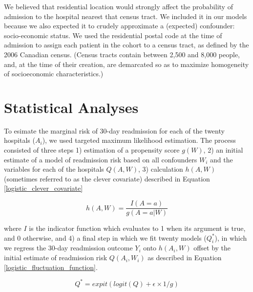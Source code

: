 \documentclass[]{article}\usepackage[]{graphicx}\usepackage[]{color}
\begin{document}
We believed that residential location would strongly affect the probability of admission to the hospital nearest that census tract. We included it in our models because we also expected it to crudely approximate a (expected) confounder: socio-economic status.  We used the residential postal code at the time of admission to assign each patient in the cohort to a census tract, as defined by the 2006 Canadian census. (Census tracts contain between 2,500 and 8,000 people, and, at the time of their creation, are demarcated so as to maximize homogeneity of socioeconomic characteristics.)

\section{Statistical Analyses}
To esimate the marginal risk of 30-day readmission for each of the twenty hospitals ($A_i$), we used targeted maximum likelihood estimation. The process consisted of three steps 1) estimation of a propensity score $g(W)$, 2) an initial estimate of a model of readmission risk based on all confounders $W_i$ and the variables for each of the hospitals $Q(A,W)$, 3) calculation $h(A,W)$ (sometimes referred to as the clever covariate) described in Equation \ref{logistic_clever_covariate}

\begin{equation}
\label{logistic_clever_covariate} 
h(A,W)=\frac{I(A=a)}{g(A=a|W)}
\end{equation}

where $I$ is the indicator function which evaluates to 1 when its argument is true, and 0 otherwise, and 4) a final step in which we fit twenty models ($Q^*_i$), in which we regress the 30-day readmission outcome $Y_i$ onto $h(A_i,W)$ offset by the initial estimate of readmission risk $Q(A_i,W_i)$ as described in Equation \ref{logistic_fluctuation_function}.

\begin{equation}
\label{logistic_fluctuation_function} 
Q^*=expit(logit(Q) + \epsilon \times 1/g)
\end{equation}
\end{document}
